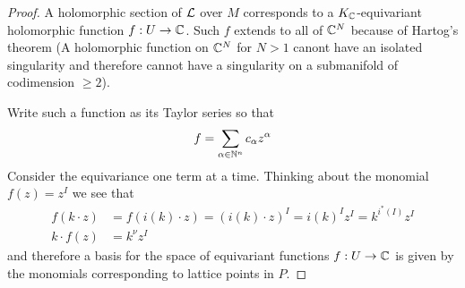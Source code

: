 \begin{proof}
    A holomorphic section of ${\mathcal{L}}$ over $M$ corresponds to a $K_{\mathbb{C}}$-equivariant holomorphic function $f:U\to \mathbb{C}$. 
    Such $f$ extends to all of $\mathbb{C}^N$ because of Hartog's theorem (A holomorphic function on $\mathbb{C}^N$ for $N>1$ canont have 
    an isolated singularity and therefore cannot have a singularity on a submanifold of codimension $\geq 2$).

    \hfill

    Write such a function as its Taylor series so that \begin{align*}
        f = \sum_{\alpha\in\mathbb{N}^n} c_\alpha z^\alpha
    \end{align*} Consider the equivariance one term at a time. 
    Thinking about the monomial $f(z) = z^I$ we 
    see that \begin{align*}
        f(k\cdot z) &= f(i(k)\cdot z) = (i(k)\cdot z)^I = i(k)^Iz^I = k^{i^*(I)}z^I \\
        k\cdot f(z) &= k^{\nu}z^I
    \end{align*} and therefore a basis for the space of equivariant functions $f:U\to \mathbb{C}$ 
    is given by the monomials corresponding to lattice points in $P$.
\end{proof}


